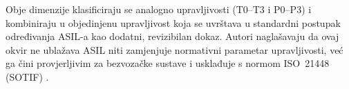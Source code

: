 Obje dimenzije klasificiraju se analogno upravljivosti (T0--T3 i P0--P3) i kombiniraju u objedinjenu upravljivost koja se uvrštava u standardni postupak određivanja ASIL-a kao dodatni, revizibilan dokaz. Autori naglašavaju da ovaj okvir ne ublažava ASIL niti zamjenjuje normativni parametar upravljivosti, već ga čini provjerljivim za bezvozačke sustave i usklađuje s normom ISO~21448 (SOTIF) \cite{shinde2026reimagining}.
